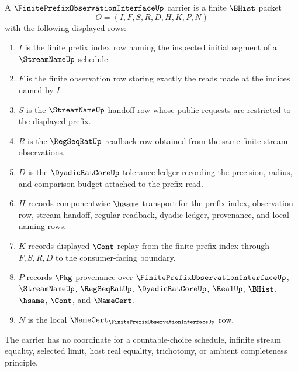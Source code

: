 \begin{definition}
\label{def:finite-prefix-observation-interface-carrier}
A $\FinitePrefixObservationInterfaceUp$ carrier is a finite $\BHist$ packet
$$
O=(I,F,S,R,D,H,K,P,N)
$$
with the following displayed rows:
\begin{enumerate}
\item $I$ is the finite prefix index row naming the inspected initial segment of a $\StreamNameUp$ schedule.
\item $F$ is the finite observation row storing exactly the reads made at the indices named by $I$.
\item $S$ is the $\StreamNameUp$ handoff row whose public requests are restricted to the displayed prefix.
\item $R$ is the $\RegSeqRatUp$ readback row obtained from the same finite stream observations.
\item $D$ is the $\DyadicRatCoreUp$ tolerance ledger recording the precision, radius, and comparison budget attached to the prefix read.
\item $H$ records componentwise $\hsame$ transport for the prefix index, observation row, stream handoff, regular readback, dyadic ledger, provenance, and local naming rows.
\item $K$ records displayed $\Cont$ replay from the finite prefix index through $F,S,R,D$ to the consumer-facing boundary.
\item $P$ records $\Pkg$ provenance over $\FinitePrefixObservationInterfaceUp$, $\StreamNameUp$, $\RegSeqRatUp$, $\DyadicRatCoreUp$, $\RealUp$, $\BHist$, $\hsame$, $\Cont$, and $\NameCert$.
\item $N$ is the local $\NameCert_{\FinitePrefixObservationInterfaceUp}$ row.
\end{enumerate}
The carrier has no coordinate for a countable-choice schedule, infinite stream equality, selected limit, host real equality, trichotomy, or ambient completeness principle.
\end{definition}

